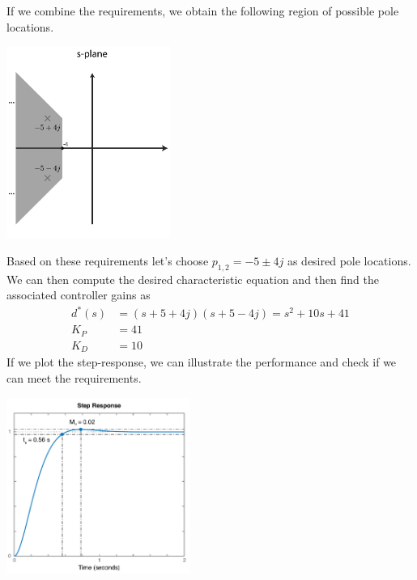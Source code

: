 \documentclass[twoside]{article}
\begin{document}
  If we combine the requirements, we obtain the following region of possible pole locations.
  
     \begin{minipage}[h]{1\linewidth}
    \begin{center}
     \includegraphics[width=0.4\textwidth]{result}
    \end{center}
  \end{minipage}
  
  Based on these requirements let's choose $p_{1,2} = -5 \pm 4 j$ as desired pole locations. 
  We can then compute the desired characteristic equation and then find the associated controller
  gains as
  \begin{align*}
  	d^*(s) &= (s + 5 + 4 j) (s + 5 - 4 j) = s^2 + 10 s + 41
	\\
	K_P &= 41
	\\
	K_D &= 10
  \end{align*}
  If we plot the step-response, we can illustrate the performance and check if we can meet the
  requirements.
  
       \begin{minipage}[h]{1\linewidth}
    \begin{center}
     \includegraphics[width=0.45\textwidth]{stepex}
    \end{center}
  \end{minipage}
  
\end{document}

